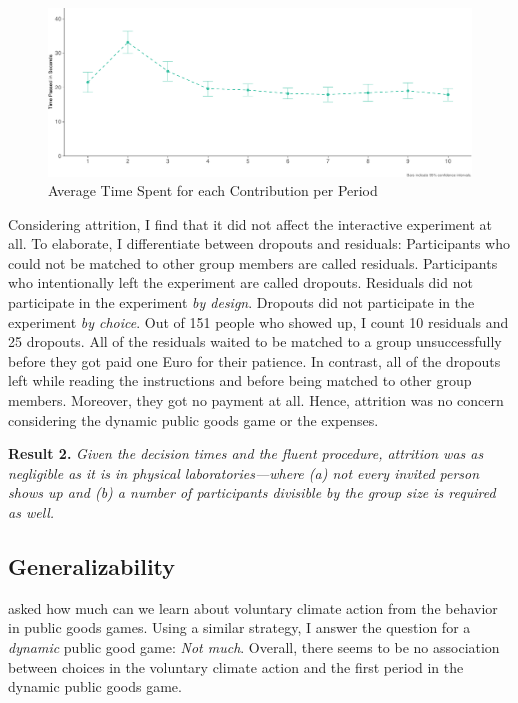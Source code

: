 \documentclass[
  authoryear,
  preprint,
  3p]{elsarticle}
\begin{document}
\begin{figure}

{\centering \includegraphics{paper_files/figure-pdf/fig-time-spent-1.pdf}

}

\caption{\label{fig-time-spent}Average Time Spent for each Contribution
per Period}

\end{figure}

Considering attrition, I find that it did not affect the interactive
experiment at all. To elaborate, I differentiate between dropouts and
residuals: Participants who could not be matched to other group members
are called residuals. Participants who intentionally left the experiment
are called dropouts. Residuals did not participate in the experiment
\emph{by design}. Dropouts did not participate in the experiment
\emph{by choice}. Out of 151 people who showed up, I count 10 residuals
and 25 dropouts. All of the residuals waited to be matched to a group
unsuccessfully before they got paid one Euro for their patience. In
contrast, all of the dropouts left while reading the instructions and
before being matched to other group members. Moreover, they got no
payment at all. Hence, attrition was no concern considering the dynamic
public goods game or the expenses.

\textbf{Result 2.} \emph{Given the decision times and the fluent
procedure, attrition was as negligible as it is in physical
laboratories---where (a) not every invited person shows up and (b) a
number of participants divisible by the group size is required as well.}

\hypertarget{sec-generalizability}{%
\subsection{Generalizability}\label{sec-generalizability}}

\citet{GKLS2020} asked how much can we learn about voluntary climate
action from the behavior in public goods games. Using a similar
strategy, I answer the question for a \emph{dynamic} public good game:
\emph{Not much}. Overall, there seems to be no association between
choices in the voluntary climate action and the first period in the
dynamic public goods game.
\end{document}
